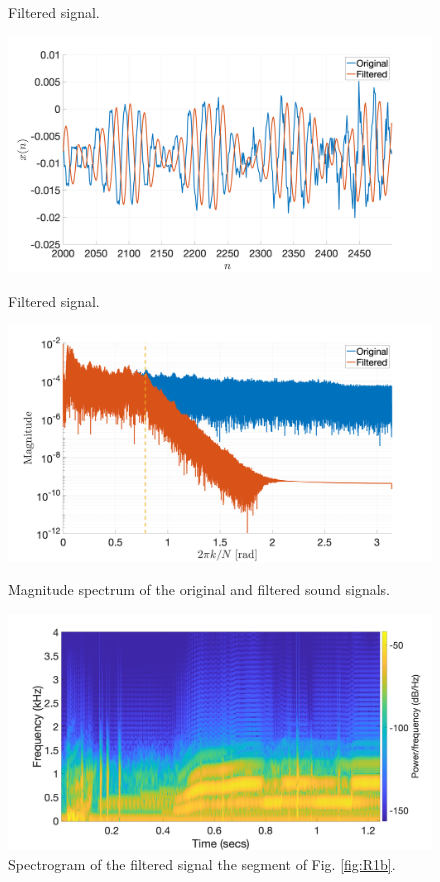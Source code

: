 \documentclass[]{scrartcl}
\begin{document}
\begin{figure}[htbp]
\begin{minipage}[b]{.49\textwidth}
		\caption{Filtered signal.}
		\label{fig:R2f_zoomNoise}
	\end{minipage}
	\hfill
	\begin{minipage}[b]{.49\textwidth}
		\centering
		\includegraphics[width= 1.1\textwidth]{figures/R2f_zoomNormal.png}
		\caption{Filtered signal.}
		\label{fig:R2f_zoomNormal}
	\end{minipage}
\begin{minipage}[b]{.49\textwidth}
	\centering
	\includegraphics[width= 1.1\textwidth]{figures/R2f_spectra.png}
	\caption{Magnitude spectrum of the original and filtered sound signals.}
	\label{fig:R2f}
\end{minipage}
\hfill
\begin{minipage}[b]{.49\textwidth}
	\centering
	\includegraphics[width= 1.1\textwidth]{figures/R2f_spectrogram.png}
	\caption{Spectrogram of the filtered signal the segment of Fig. \ref{fig:R1b}.}
	\label{fig:R2f_spectrogram}
\end{minipage}
\end{figure}
\end{document}
